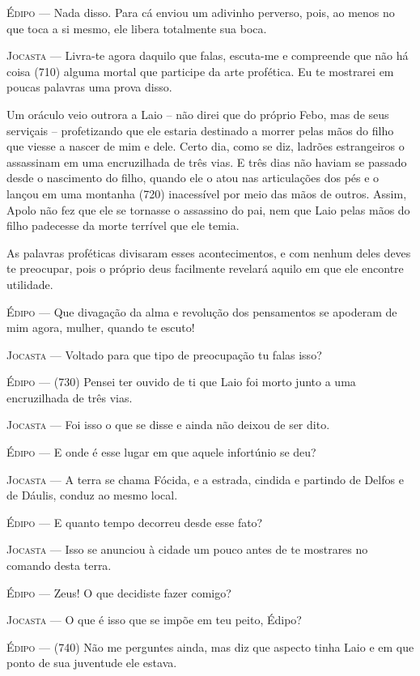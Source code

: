 \textsc{Édipo} --- Nada disso. Para cá enviou um adivinho perverso, pois, ao menos no que
toca a si mesmo, ele libera totalmente sua boca.

\textsc{Jocasta} --- Livra-te agora daquilo que falas, escuta-me e compreende que não há
coisa (710) alguma mortal que participe da arte profética. Eu te
mostrarei em poucas palavras uma prova disso.

Um oráculo veio outrora a Laio -- não direi que do próprio Febo, mas de
seus serviçais -- profetizando que ele estaria destinado a morrer pelas
mãos do filho que viesse a nascer de mim e dele. Certo dia, como se diz,
ladrões estrangeiros o assassinam em uma encruzilhada de três vias. E
três dias não haviam se passado desde o nascimento do filho, quando ele
o atou nas articulações dos pés e o lançou em uma montanha (720)
inacessível por meio das mãos de outros. Assim, Apolo não fez que ele se
tornasse o assassino do pai, nem que Laio pelas mãos do filho padecesse
da morte terrível que ele temia.

As palavras proféticas divisaram esses acontecimentos, e com nenhum
deles deves te preocupar, pois o próprio deus facilmente revelará aquilo
em que ele encontre utilidade.

\textsc{Édipo} --- Que divagação da alma e revolução dos pensamentos se apoderam de mim
agora, mulher, quando te escuto!

\textsc{Jocasta} --- Voltado para que tipo de preocupação tu falas isso?

\textsc{Édipo} --- (730) Pensei ter ouvido de ti que Laio foi morto junto a uma
encruzilhada de três vias.

\textsc{Jocasta} --- Foi isso o que se disse e ainda não deixou de ser dito.

\textsc{Édipo} --- E onde é esse lugar em que aquele infortúnio se deu?

\textsc{Jocasta} --- A terra se chama Fócida, e a estrada, cindida e partindo de Delfos e de
Dáulis, conduz ao mesmo local.

\textsc{Édipo} --- E quanto tempo decorreu desde esse fato?

\textsc{Jocasta} --- Isso se anunciou à cidade um pouco antes de te mostrares no comando
desta terra.

\textsc{Édipo} --- Zeus! O que decidiste fazer comigo?

\textsc{Jocasta} --- O que é isso que se impõe em teu peito, Édipo?

\textsc{Édipo} --- (740) Não me perguntes ainda, mas diz que aspecto tinha Laio e em que
ponto de sua juventude ele estava.

